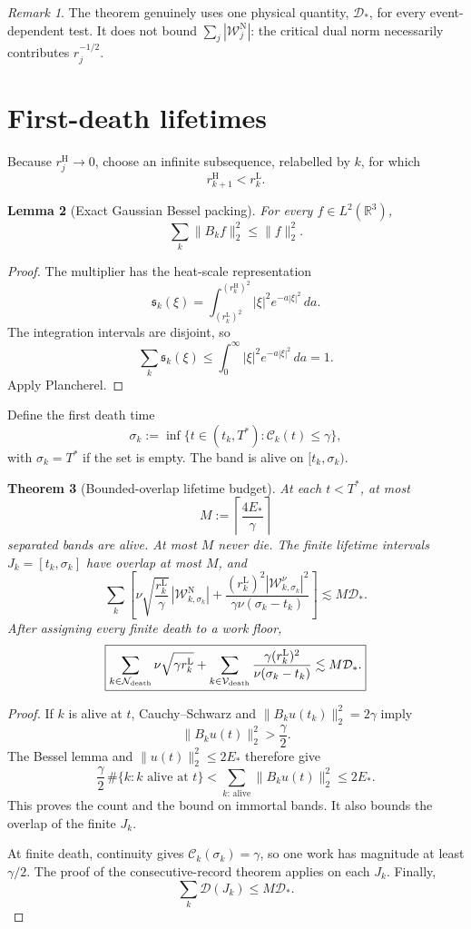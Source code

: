 \documentclass[11pt]{article}
\newtheorem{theorem}{Theorem}
\newtheorem{lemma}[theorem]{Lemma}
\theoremstyle{remark}
\newtheorem{remark}[theorem]{Remark}
\newcommand{\R}{\mathbb R}
\newcommand{\D}{\mathcal D}
\newcommand{\WN}{\mathcal W^{\mathrm N}}
\newcommand{\WV}{\mathcal W^\nu}
\newcommand{\Cband}{\mathcal C}
\begin{document}
\begin{remark}
The theorem genuinely uses one physical quantity, \(\D_*\), for every
event-dependent test.  It does not bound \(\sum_j|\WN_j|\): the critical
dual norm necessarily contributes \(r_j^{-1/2}\).
\end{remark}

\section{First-death lifetimes}

Because \(r_j^{\mathrm H}\to0\), choose an infinite subsequence, relabelled
by \(k\), for which
\[
 r_{k+1}^{\mathrm H}<r_k^{\mathrm L}.
\]

\begin{lemma}[Exact Gaussian Bessel packing]
For every \(f\in L^2(\R^3)\),
\[
 \sum_k\|B_kf\|_2^2\le\|f\|_2^2.
\]
\end{lemma}

\begin{proof}
The multiplier has the heat-scale representation
\[
 \mathfrak s_k(\xi)
 =
 \int_{(r_k^{\mathrm L})^2}^{(r_k^{\mathrm H})^2}
 |\xi|^2e^{-a|\xi|^2}\,da.
\]
The integration intervals are disjoint, so
\[
 \sum_k\mathfrak s_k(\xi)
 \le
 \int_0^\infty|\xi|^2e^{-a|\xi|^2}\,da
 =1.
\]
Apply Plancherel.
\end{proof}

Define the first death time
\[
 \sigma_k
 :=
 \inf\{t\in(t_k,T^*):\Cband_k(t)\le\gamma\},
\]
with \(\sigma_k=T^*\) if the set is empty.  The band is alive on
\([t_k,\sigma_k)\).

\begin{theorem}[Bounded-overlap lifetime budget]
At each \(t<T^*\), at most
\[
 M:=\left\lceil\frac{4E_*}{\gamma}\right\rceil
\]
separated bands are alive.  At most \(M\) never die.  The finite lifetime
intervals \(J_k=[t_k,\sigma_k]\) have overlap at most \(M\), and
\[
\boxed{
 \sum_k\left[
 \nu\sqrt{\frac{r_k^{\mathrm L}}{\gamma}}\,
 |\WN_{k,\sigma_k}|
 +
 \frac{
 (r_k^{\mathrm L})^2|\WV_{k,\sigma_k}|^2
 }{
 \gamma\nu(\sigma_k-t_k)
 }
 \right]
 \lesssim
 M\D_*.
}
\]
After assigning every finite death to a work floor,
\[
\boxed{
 \sum_{k\in\mathcal N_{\rm death}}
 \nu\sqrt{\gamma r_k^{\mathrm L}}
 +
 \sum_{k\in\mathcal V_{\rm death}}
 \frac{
 \gamma(r_k^{\mathrm L})^2
 }{
 \nu(\sigma_k-t_k)
 }
 \lesssim
 M\D_*.
}
\]
\end{theorem}

\begin{proof}
If \(k\) is alive at \(t\), Cauchy--Schwarz and
\(\|B_ku(t_k)\|_2^2=2\gamma\) imply
\[
 \|B_ku(t)\|_2^2>\frac\gamma2.
\]
The Bessel lemma and \(\|u(t)\|_2^2\le2E_*\) therefore give
\[
 \frac\gamma2\,\#\{k:k\text{ alive at }t\}
 <
 \sum_{k:\,\mathrm{alive}}\|B_ku(t)\|_2^2
 \le2E_*.
\]
This proves the count and the bound on immortal bands.  It also bounds the
overlap of the finite \(J_k\).

At finite death, continuity gives
\(\Cband_k(\sigma_k)=\gamma\), so one work has magnitude at least
\(\gamma/2\).  The proof of the consecutive-record theorem applies on
each \(J_k\).  Finally,
\[
 \sum_k\D(J_k)\le M\D_*.
\]
\end{proof}
\end{document}
